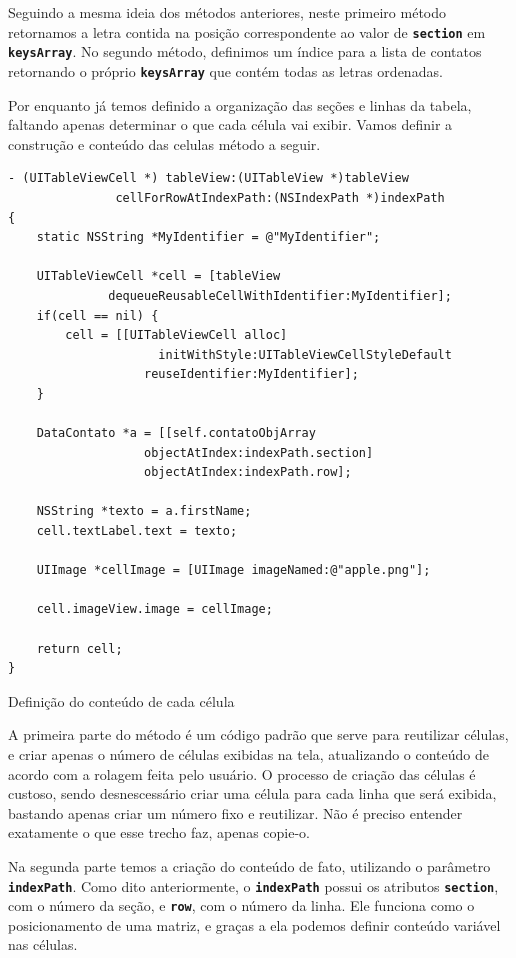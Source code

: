 \documentclass[a4paper,12pt,brazil,doubleside]{book}
\begin{document}
\begin{singlespace}
Seguindo a mesma ideia dos métodos anteriores, neste primeiro método retornamos a letra contida na posição correspondente ao valor de \texttt{\textbf{section}} em \texttt{\textbf{keysArray}}. No segundo método, definimos um índice para a lista de contatos retornando o próprio \texttt{\textbf{keysArray}} que contém todas as letras ordenadas.

Por enquanto já temos definido a organização das seções e linhas da tabela, faltando apenas determinar o que cada célula vai exibir. Vamos definir a construção e conteúdo das celulas método a seguir.

\begin{listing}[H]
\begin{verbatim}
- (UITableViewCell *) tableView:(UITableView *)tableView
               cellForRowAtIndexPath:(NSIndexPath *)indexPath
{
    static NSString *MyIdentifier = @"MyIdentifier";
    
    UITableViewCell *cell = [tableView 
              dequeueReusableCellWithIdentifier:MyIdentifier];
    if(cell == nil) {
        cell = [[UITableViewCell alloc] 
                     initWithStyle:UITableViewCellStyleDefault
                   reuseIdentifier:MyIdentifier];
    }

    DataContato *a = [[self.contatoObjArray
                   objectAtIndex:indexPath.section]
                   objectAtIndex:indexPath.row];

    NSString *texto = a.firstName;
    cell.textLabel.text = texto;
        
    UIImage *cellImage = [UIImage imageNamed:@"apple.png"];
        
    cell.imageView.image = cellImage;
    
    return cell;
}
\end{verbatim}
\caption{Definição do conteúdo de cada célula}
\end{listing}


A primeira parte do método é um código padrão que serve para reutilizar células, e criar apenas o número de células exibidas na tela, atualizando o conteúdo de acordo com a rolagem feita pelo usuário. O processo de criação das células é custoso, sendo desnescessário criar uma célula para cada linha que será exibida, bastando apenas criar um número fixo e reutilizar. Não é preciso entender exatamente o que esse trecho faz, apenas copie-o.

Na segunda parte temos a criação do conteúdo de fato, utilizando o parâmetro \texttt{\textbf{indexPath}}. Como dito anteriormente, o \texttt{\textbf{indexPath}} possui os atributos \texttt{\textbf{section}}, com o número da seção, e \texttt{\textbf{row}}, com o número da linha. Ele funciona como o posicionamento de uma matriz, e graças a ela podemos definir conteúdo variável nas células.


\end{singlespace}
\end{document}
